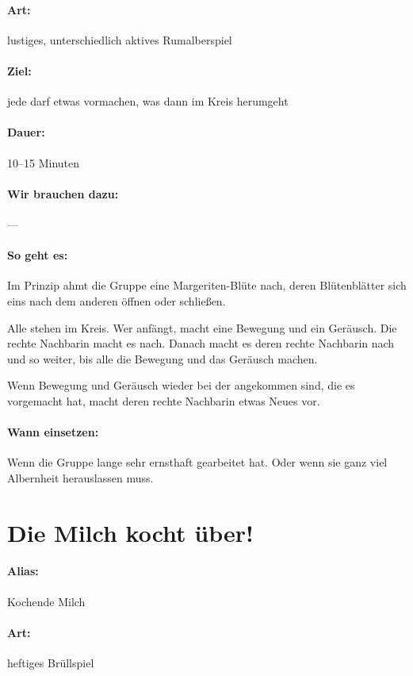 \paragraph{Art:} lustiges, unterschiedlich aktives Rumalberspiel
\paragraph{Ziel:} jede darf etwas vormachen, was dann im Kreis herumgeht
\paragraph{Dauer:} 10--15 Minuten
\paragraph{Wir brauchen dazu:} ---
\paragraph{So geht es:} Im Prinzip ahmt die Gruppe eine Margeriten-Blüte nach, deren Blütenblätter sich eins nach dem anderen öffnen oder schließen.

Alle stehen im Kreis. Wer anfängt, macht eine Bewegung und ein Geräusch. Die rechte Nachbarin macht es nach. Danach macht es deren rechte Nachbarin nach und so weiter, bis alle die Bewegung und das Geräusch machen.

Wenn Bewegung und Geräusch wieder bei der angekommen sind, die es vorgemacht hat, macht deren rechte Nachbarin etwas Neues vor.
\paragraph{Wann einsetzen:} Wenn die Gruppe lange sehr ernsthaft gearbeitet hat. Oder wenn sie ganz viel Albernheit herauslassen muss.

\section{Die Milch kocht über!}
\paragraph{Alias:} Kochende Milch
\paragraph{Art:} heftiges Brüllspiel
